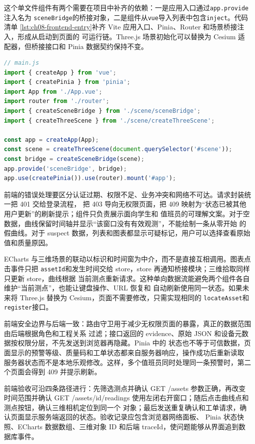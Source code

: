 这个单文件组件有两个需要在项目中补齐的依赖：一是应用入口通过\texttt{app.provide}注入名为
\texttt{sceneBridge}的桥接对象，二是组件从\texttt{vue}导入列表中包含\texttt{inject}。代码清单
\ref{lst:ch08-frontend-entry}补齐 Vite 应用入口、Pinia、Router 和场景桥接注入，形成从启动到页面的
可运行链。Three.js 场景初始化可以替换为 Cesium 适配器，但桥接接口和 Pinia 数据契约保持不变。

\begin{lstlisting}[label={lst:ch08-frontend-entry},language=JavaScript,caption={Vue 应用入口与场景桥接注入}]
// main.js
import { createApp } from 'vue';
import { createPinia } from 'pinia';
import App from './App.vue';
import router from './router';
import { createSceneBridge } from './scene/sceneBridge';
import { createThreeScene } from './scene/createThreeScene';

const app = createApp(App);
const scene = createThreeScene(document.querySelector('#scene'));
const bridge = createSceneBridge(scene);
app.provide('sceneBridge', bridge);
app.use(createPinia()).use(router).mount('#app');
\end{lstlisting}

前端的错误处理要区分认证过期、权限不足、业务冲突和网络不可达。请求封装统一把 401 交给登录流程，
把 403 导向无权限页面，把 409 映射为“状态已被其他用户更新”的刷新提示；组件只负责展示面向学生和
值班员的可理解文案。对于空数据，曲线保留时间轴并显示“该窗口没有有效观测”，不能绘制一条从零开始
的假曲线。对于 suspect 数据，列表和图表都显示可疑标记，用户可以选择查看原始值和质量原因。

ECharts 与三维场景的联动以标识和时间窗为中介，而不是直接互相调用。图表点击事件只把
\texttt{assetId}和发生时间交给 store，store 再通知桥接模块；三维拾取同样只更新 store，曲线根据
当前测点重新请求。这种单向数据流能避免两个组件各自维护“当前测点”，也能让键盘操作、URL 恢复和
自动刷新使用同一状态。如果未来将 Three.js 替换为 Cesium，页面不需要修改，只需实现相同的
\texttt{locateAsset}和\texttt{register}接口。

前端安全边界与后端一致：路由守卫用于减少无权限页面的暴露，真正的数据范围由后端根据角色和工程关系
过滤；接口返回的 evidence、原始 JSON 和设备元数据按权限分层，不先发送到浏览器再隐藏。Pinia 中的
状态也不等于可信数据，页面显示的预警等级、质量码和工单状态都来自服务器响应，操作成功后重新读取
服务器状态而不是本地乐观修改。这样，多个值班员同时处理同一条预警时，第二个页面会得到 409 并提示刷新。

前端验收可沿四条路径进行：先筛选测点并确认 GET /assets 参数正确，再改变时间范围并确认
GET /assets/{id}/readings 使用左闭右开窗口；随后点击曲线点和测点按钮，确认三维相机定位到同一个
对象；最后发送重复确认和工单请求，确认页面显示服务端返回的状态。验收记录应包含浏览器网络面板、
Pinia 状态快照、ECharts 数据数组、三维对象 ID 和后端 traceId，使问题能够从界面追到数据库事件。

